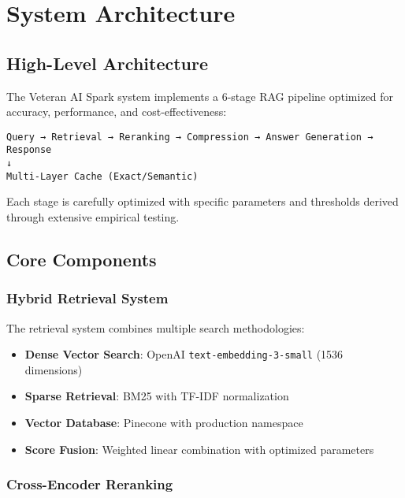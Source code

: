\documentclass[11pt,a4paper]{article}
\begin{document}
\section{System Architecture}

\subsection{High-Level Architecture}

The Veteran AI Spark system implements a 6-stage RAG pipeline optimized for accuracy, performance, and cost-effectiveness:

\begin{center}
\texttt{Query → Retrieval → Reranking → Compression → Answer Generation → Response}\\
\texttt{↓}\\
\texttt{Multi-Layer Cache (Exact/Semantic)}
\end{center}

Each stage is carefully optimized with specific parameters and thresholds derived through extensive empirical testing.

\subsection{Core Components}

\subsubsection{Hybrid Retrieval System}

The retrieval system combines multiple search methodologies:

\begin{itemize}
    \item \textbf{Dense Vector Search}: OpenAI \texttt{text-embedding-3-small} (1536 dimensions)
    \item \textbf{Sparse Retrieval}: BM25 with TF-IDF normalization
    \item \textbf{Vector Database}: Pinecone with production namespace
    \item \textbf{Score Fusion}: Weighted linear combination with optimized parameters
\end{itemize}

\subsubsection{Cross-Encoder Reranking}
\end{document}
